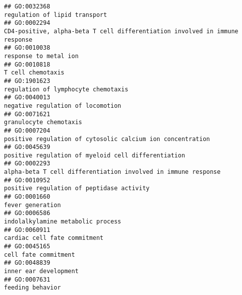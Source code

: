 \documentclass[
]{article}
\begin{document}
\begin{verbatim}
## GO:0032368                                                                                                                    regulation of lipid transport
## GO:0002294                                                                      CD4-positive, alpha-beta T cell differentiation involved in immune response
## GO:0010038                                                                                                                            response to metal ion
## GO:0010818                                                                                                                                T cell chemotaxis
## GO:1901623                                                                                                              regulation of lymphocyte chemotaxis
## GO:0040013                                                                                                                negative regulation of locomotion
## GO:0071621                                                                                                                           granulocyte chemotaxis
## GO:0007204                                                                                       positive regulation of cytosolic calcium ion concentration
## GO:0045639                                                                                              positive regulation of myeloid cell differentiation
## GO:0002293                                                                                    alpha-beta T cell differentiation involved in immune response
## GO:0010952                                                                                                        positive regulation of peptidase activity
## GO:0001660                                                                                                                                 fever generation
## GO:0006586                                                                                                                indolalkylamine metabolic process
## GO:0060911                                                                                                                     cardiac cell fate commitment
## GO:0045165                                                                                                                             cell fate commitment
## GO:0048839                                                                                                                            inner ear development
## GO:0007631                                                                                                                                 feeding behavior

\end{verbatim}
\end{document}
